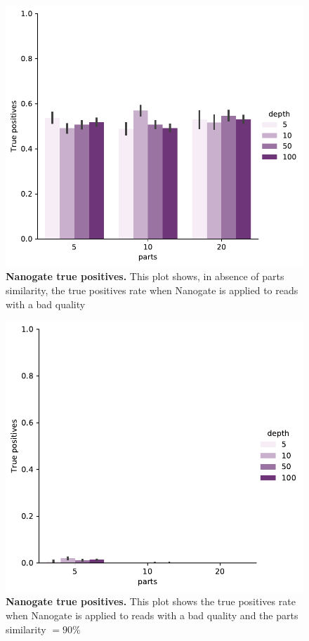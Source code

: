 \documentclass[11pt, a4paper]{article}
\begin{document}
 \begin{figure}[ht]
    \begin{center}
    \includegraphics[width=1.35\textwidth]{../results/images_notebook/v_450/sim_00_good_reads_true_positves.pdf}
    \end{center}
    \caption{{\bf Nanogate true positives.}  This plot shows, in absence of parts similarity, the true positives rate when Nanogate is applied to reads with a bad quality }
   \label{fig:v_450_sim_00_good_read_true_positives}
\end{figure}

 \begin{figure}[ht]
    \begin{center}
    \includegraphics[width=1.35\textwidth]{../results/images_notebook/v_450/sim_90_good_reads_true_positves.pdf}
    \end{center}
    \caption{{\bf Nanogate true positives.}  This plot shows the true positives rate when Nanogate is applied to reads with a bad quality and the parts similarity $=90\%$ }
   \label{fig:v_450_sim_90_true_positives}
\end{figure}
\end{document}
